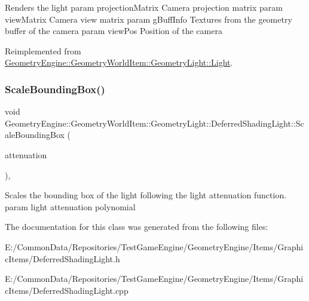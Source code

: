 Renders the light param projection\+Matrix Camera projection matrix param view\+Matrix Camera view matrix param g\+Buff\+Info Textures from the geometry buffer of the camera param view\+Pos Position of the camera 

Reimplemented from \mbox{\hyperlink{class_geometry_engine_1_1_geometry_world_item_1_1_geometry_light_1_1_light_a4dfee4fc27c75493f992a84c2ea3ff95}{Geometry\+Engine\+::\+Geometry\+World\+Item\+::\+Geometry\+Light\+::\+Light}}.

\mbox{\label{class_geometry_engine_1_1_geometry_world_item_1_1_geometry_light_1_1_deferred_shading_light_afeb4ce0c059042c837cc853701811be9}} 
\subsubsection{\texorpdfstring{ScaleBoundingBox()}{ScaleBoundingBox()}}
{\footnotesize\ttfamily void Geometry\+Engine\+::\+Geometry\+World\+Item\+::\+Geometry\+Light\+::\+Deferred\+Shading\+Light\+::\+Scale\+Bounding\+Box (\begin{DoxyParamCaption}\item[{const Q\+Vector3D \&}]{attenuation }\end{DoxyParamCaption})\hspace{0.3cm}{\ttfamily [protected]}, {\ttfamily [virtual]}}

Scales the bounding box of the light following the light attenuation function. param light attenuation polynomial 

The documentation for this class was generated from the following files\+:\begin{DoxyCompactItemize}
\item 
E\+:/\+Common\+Data/\+Repositories/\+Test\+Game\+Engine/\+Geometry\+Engine/\+Items/\+Graphic\+Items/Deferred\+Shading\+Light.\+h\item 
E\+:/\+Common\+Data/\+Repositories/\+Test\+Game\+Engine/\+Geometry\+Engine/\+Items/\+Graphic\+Items/Deferred\+Shading\+Light.\+cpp\end{DoxyCompactItemize}
